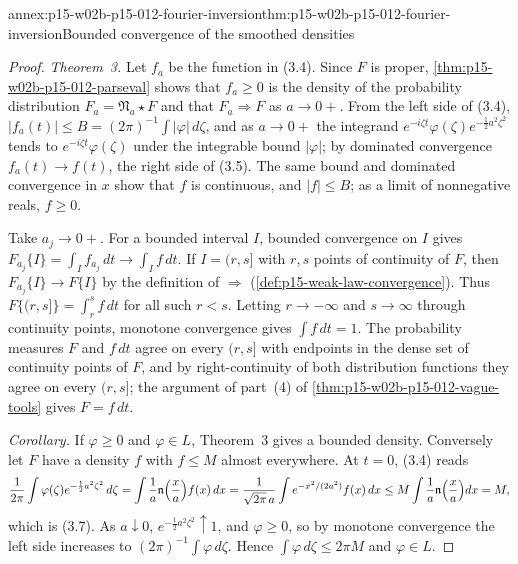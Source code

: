 \begin{annexitem}{annex:p15-w02b-p15-012-fourier-inversion}{thm:p15-w02b-p15-012-fourier-inversion}{Bounded convergence of the smoothed densities}
\begin{proof}
\emph{Theorem~3.} Let \(f_a\) be the function in (3.4). Since \(F\) is proper,
\cref{thm:p15-w02b-p15-012-parseval} shows that \(f_a\geq0\) is the density of
the probability distribution \(F_a=\mathfrak N_a\star F\) and that
\(F_a\Rightarrow F\) as \(a\to0+\). From the left side of (3.4),
\(|f_a(t)|\leq B=(2\pi)^{-1}\int|\varphi|\,d\zeta\), and as \(a\to0+\) the
integrand \(e^{-i\zeta t}\varphi(\zeta)e^{-\frac12a^2\zeta^2}\) tends to
\(e^{-i\zeta t}\varphi(\zeta)\) under the integrable bound \(|\varphi|\); by
dominated convergence \(f_a(t)\to f(t)\), the right side of (3.5). The same
bound and dominated convergence in \(x\) show that \(f\) is continuous, and
\(|f|\leq B\); as a limit of nonnegative reals, \(f\geq0\).

Take \(a_j\to0+\). For a bounded interval \(I\), bounded convergence on \(I\)
gives \(F_{a_j}\{I\}=\int_If_{a_j}\,dt\to\int_If\,dt\). If \(I=(r,s]\) with
\(r,s\) points of continuity of \(F\), then \(F_{a_j}\{I\}\to F\{I\}\) by the
definition of \(\Rightarrow\) (\cref{def:p15-weak-law-convergence}). Thus
\(F\{(r,s]\}=\int_r^sf\,dt\) for all such \(r<s\). Letting \(r\to-\infty\)
and \(s\to\infty\) through continuity points, monotone convergence gives
\(\int f\,dt=1\). The probability measures \(F\) and \(f\,dt\) agree on every
\((r,s]\) with endpoints in the dense set of continuity points of \(F\), and
by right-continuity of both distribution functions they agree on every
\((r,s]\); the argument of part~(4) of
\cref{thm:p15-w02b-p15-012-vague-tools} gives \(F=f\,dt\).

\emph{Corollary.} If \(\varphi\geq0\) and \(\varphi\in L\), Theorem~3 gives a
bounded density. Conversely let \(F\) have a density \(f\) with \(f\leq M\)
almost everywhere. At \(t=0\), (3.4) reads
\[
 \frac1{2\pi}\int\varphi(\zeta)e^{-\frac12a^2\zeta^2}\,d\zeta
 =\int\frac1a\mathfrak n\Bigl(\frac xa\Bigr)f(x)\,dx
 =\frac1{\sqrt{2\pi}\,a}\int e^{-x^2/(2a^2)}f(x)\,dx
 \leq M\int\frac1a\mathfrak n\Bigl(\frac xa\Bigr)dx=M,
\]
which is (3.7). As \(a\downarrow0\), \(e^{-\frac12a^2\zeta^2}\uparrow1\), and
\(\varphi\geq0\), so by monotone convergence the left side increases to
\((2\pi)^{-1}\int\varphi\,d\zeta\). Hence \(\int\varphi\,d\zeta\leq2\pi M\) and
\(\varphi\in L\).
\end{proof}
\end{annexitem}

